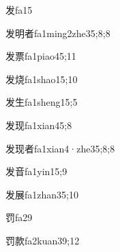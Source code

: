 
\begin{verbete}{发}{fa1}{5}
\end{verbete}

\begin{verbete}{发明者}{fa1ming2zhe3}{5;8;8}
\end{verbete}

\begin{verbete}{发票}{fa1piao4}{5;11}
\end{verbete}

\begin{verbete}{发烧}{fa1shao1}{5;10}
\end{verbete}

\begin{verbete}{发生}{fa1sheng1}{5;5}
\end{verbete}

\begin{verbete}{发现}{fa1xian4}{5;8}
\end{verbete}

\begin{verbete}{发现者}{fa1xian4·zhe3}{5;8;8}
\end{verbete}

\begin{verbete}{发音}{fa1yin1}{5;9}
\end{verbete}

\begin{verbete}{发展}{fa1zhan3}{5;10}
\end{verbete}

\begin{verbete}{罚}{fa2}{9}
\end{verbete}

\begin{verbete}{罚款}{fa2kuan3}{9;12}
\end{verbete}

